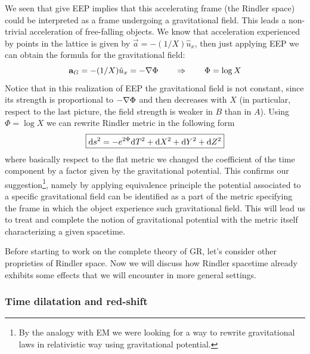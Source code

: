 \documentclass[../main/main.tex]{subfiles}
\begin{document}
We seen that give EEP implies that this accelerating frame (the Rindler space) could be interpreted as a frame undergoing a gravitational field. This leads a non-trivial acceleration of free-falling objects. We know that acceleration experienced by points in the lattice is given by $\vec a=-(1/X)\hat u_x$, then just applying EEP we can obtain the formula for the gravitational field: 
\[\vec a_G=-(1/X)\hat u_x=-\vect\nabla\Phi\qquad\Rightarrow\qquad\Phi=\log X\]
Notice that in this realization of EEP the gravitational field is not constant, since its strength is proportional to $-\vect\nabla\Phi$ and then decreases with $X$ (in particular, respect to the last picture, the field strength is weaker in $B$ than in $A$). Using $\Phi=\log X$ we can rewrite Rindler metric in the following form
\begin{equation}\boxed{
\textup{d} s^2=-e^{2\Phi}\textup{d} T^2+\textup{d} X^2+\textup{d} Y^2+\textup{d} Z^2
}\end{equation}
where basically respect to the flat metric we changed the coefficient of the time component by a factor given by the gravitational potential. This confirms our suggestion\footnote{By the analogy with EM we were looking for a way to rewrite gravitational laws in relativistic way using gravitational potential.}, namely by applying equivalence principle the potential associated to a specific gravitational field can be identified as a part of the metric specifying the frame in which the object experience such gravitational field. 
This will lead us to treat and complete the notion of gravitational potential with the metric itself characterizing a given spacetime. 

Before starting to work on the complete theory of GR, let's consider other proprieties of Rindler space. 
Now we will discuss how Rindler spacetime already exhibits some effects that we will encounter in more general settings. 

\subsubsection{Time dilatation and red-shift}
\end{document}
